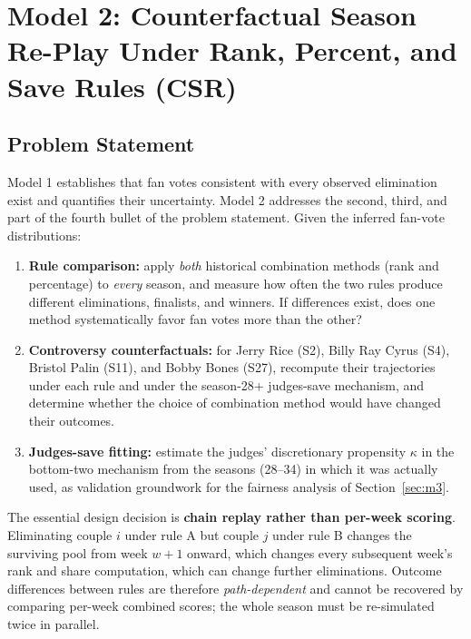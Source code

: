 \documentclass[11pt]{article}
\begin{document}
\section{Model 2: Counterfactual Season Re-Play Under Rank, Percent, and Save Rules (CSR)}
\label{sec:m2}

\subsection{Problem Statement}

Model 1 establishes that fan votes consistent with every observed elimination exist and
quantifies their uncertainty. Model 2 addresses the second, third, and part of the
fourth bullet of the problem statement. Given the inferred fan-vote distributions:
\begin{enumerate}[itemsep=2pt]
  \item \textbf{Rule comparison:} apply \emph{both} historical combination methods (rank
        and percentage) to \emph{every} season, and measure how often the two rules
        produce different eliminations, finalists, and winners. If differences exist,
        does one method systematically favor fan votes more than the other?
  \item \textbf{Controversy counterfactuals:} for Jerry Rice (S2), Billy Ray Cyrus (S4),
        Bristol Palin (S11), and Bobby Bones (S27), recompute their trajectories under
        each rule and under the season-28+ judges-save mechanism, and determine whether
        the choice of combination method would have changed their outcomes.
  \item \textbf{Judges-save fitting:} estimate the judges' discretionary propensity
        $\kappa$ in the bottom-two mechanism from the seasons (28--34) in which it was
        actually used, as validation groundwork for the fairness analysis of
        Section~\ref{sec:m3}.
\end{enumerate}

The essential design decision is \textbf{chain replay rather than per-week scoring}.
Eliminating couple $i$ under rule A but couple $j$ under rule B changes the surviving
pool from week $w+1$ onward, which changes every subsequent week's rank and share
computation, which can change further eliminations. Outcome differences between rules
are therefore \emph{path-dependent} and cannot be recovered by comparing per-week
combined scores; the whole season must be re-simulated twice in parallel.
\end{document}
